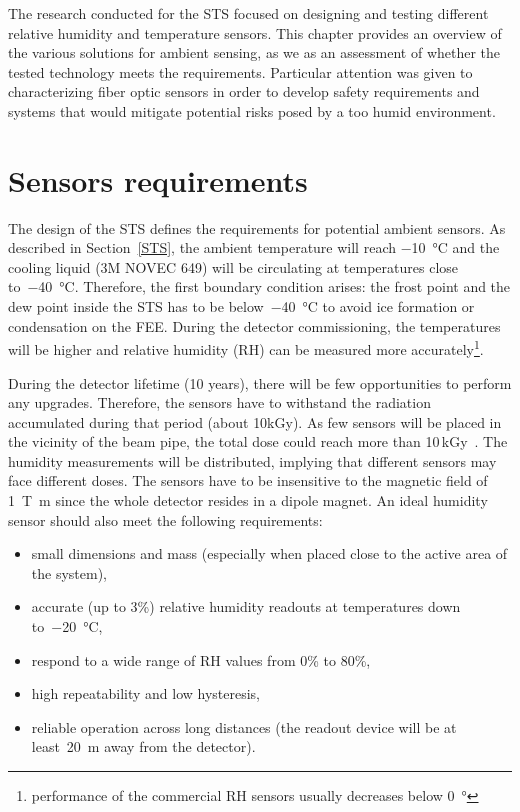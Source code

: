 The research conducted for the \gls{STS} focused on designing and testing different relative humidity and temperature sensors. This chapter provides an overview of the various solutions for ambient sensing, as we as an assessment of whether the tested technology meets the requirements. Particular attention was given to characterizing fiber optic sensors in order to develop safety requirements and systems that would mitigate potential risks posed by a too humid environment. 


\section{Sensors requirements}

The design of the \gls{STS} \cite{Heuser:54798} defines the requirements for potential ambient sensors. As described in Section~\ref{STS}, the ambient temperature will reach \SI{-10}{\celsius} and the cooling liquid (3M NOVEC 649) will be circulating at temperatures close to~\SI{-40}{\celsius}. Therefore, the first boundary condition arises: the frost point and the dew point inside the \gls{STS} has to be below~\SI{-40}{\celsius} to avoid ice formation or condensation on the \gls{FEE}.
During the detector commissioning, the temperatures will be higher and relative humidity (\gls{RH}) can be measured more accurately\footnote{performance of the commercial RH sensors usually decreases below \SI{0}{\degree}}. 

During the detector lifetime (10 years), there will be few opportunities to perform any upgrades. Therefore, the sensors have to withstand the radiation accumulated during that period (about 10kGy). As few sensors will be placed in the vicinity of the beam pipe, the total dose could reach more than 10\,kGy~\cite{Heuser:54798}. The humidity measurements will be distributed, implying that different sensors may face different doses. 
The sensors have to be insensitive to the magnetic field of \SI{1}{\tesla\metre} since the whole detector resides in a dipole magnet.  An ideal humidity sensor should also meet the following requirements:
\begin{itemize}
    \item small dimensions and mass (especially when placed close to the active area of the system),
    \item accurate (up to 3\%) relative humidity readouts at temperatures down to~\SI{-20}{\celsius}, 
    \item respond to a wide range of \gls{RH} values from 0\% to 80\%,
    \item high repeatability and low hysteresis,
    \item reliable operation across long distances (the readout device will be at least~\SI{20}{\metre} away from the detector).
\end{itemize}


